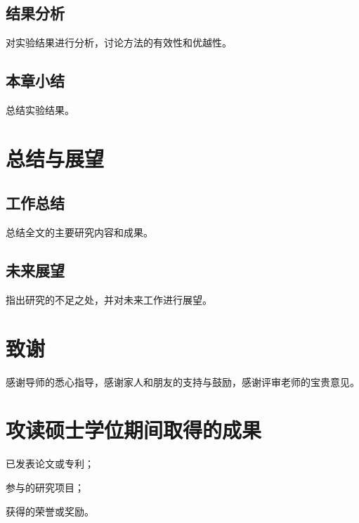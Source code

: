 \documentclass[12pt,a4paper,openright,UTF8]{ctexbook}
\begin{document}
\section{结果分析}
\label{sec:analysis}

对实验结果进行分析，讨论方法的有效性和优越性。

\section{本章小结}
\label{sec:experiment-summary}

总结实验结果。


\chapter{总结与展望}
\label{chap:conclusion}

\section{工作总结}
\label{sec:summary}

总结全文的主要研究内容和成果。

\section{未来展望}
\label{sec:future}

指出研究的不足之处，并对未来工作进行展望。




\chapter*{致\quad 谢}

感谢导师的悉心指导，感谢家人和朋友的支持与鼓励，感谢评审老师的宝贵意见。

\chapter*{攻读硕士学位期间取得的成果}

\begin{enumerate}[label={[\arabic*]}]
    \item 已发表论文或专利；
    \item 参与的研究项目；
    \item 获得的荣誉或奖励。
\end{enumerate}
\end{document}
